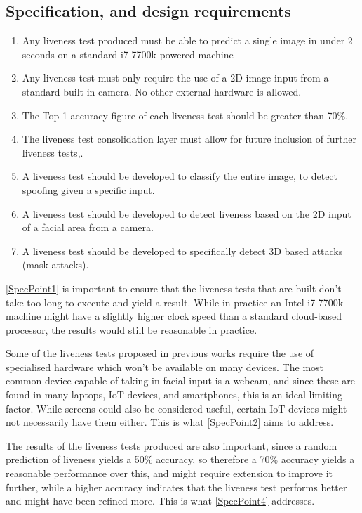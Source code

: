 \documentclass[10pt,a4paper]{article}
\begin{document}
    \subsection{Specification, and design requirements}
        \begin{enumerate}
            \item \label{SpecPoint1} Any liveness test produced must be able to predict a single image in under 2 seconds on a standard i7-7700k powered machine
            \item \label{SpecPoint2} Any liveness test must only require the use of a 2D image input from a standard built in camera. No other external hardware is allowed.
            \item \label{SpecPoint3} The Top-1 accuracy figure of each liveness test should be greater than 70\%.
            \item \label{SpecPoint4} The liveness test consolidation layer must allow for future inclusion of further liveness tests,.
            \item \label{SpecPoint5} A liveness test should be developed to classify the entire image, to detect spoofing given a specific input.
            \item \label{SpecPoint6} A liveness test should be developed to detect liveness based on the 2D input of a facial area from a camera.
            \item \label{SpecPoint7} A liveness test should be developed to specifically detect 3D based attacks (mask attacks).
        \end{enumerate}

        \ref{SpecPoint1} is important to ensure that the liveness tests that are built don't take too long to execute and yield a result. While in practice an Intel i7-7700k machine might have a
        slightly higher clock speed than a standard cloud-based processor, the results would still be reasonable in practice.

        Some of the liveness tests proposed in previous works require the use of specialised hardware which won't be available on many devices. The most common device capable of taking in facial input is a
        webcam, and since these are found in many laptops, IoT devices, and smartphones, this is an ideal limiting factor. While screens could also be considered useful, certain IoT devices might not necessarily have them either.
        This is what \ref{SpecPoint2} aims to address.

        The results of the liveness tests produced are also important, since a random prediction of liveness yields a 50\% accuracy, so therefore a 70\% accuracy yields a reasonable performance over this, and might require extension to improve it further,
        while a higher accuracy indicates that the liveness test performs better and might have been refined more. This is what \ref{SpecPoint4} addresses.
\end{document}
